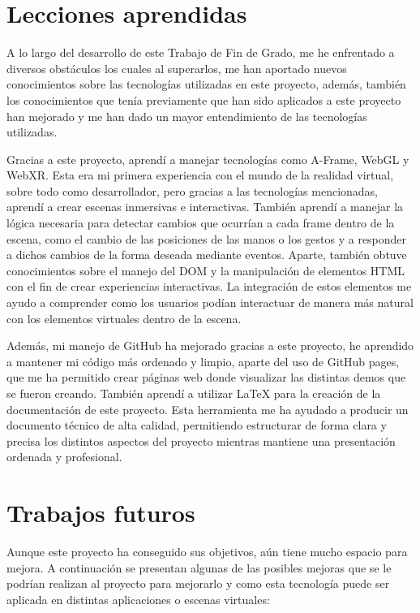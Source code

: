 \documentclass[a4paper, 12pt]{book}
\begin{document}
\section{Lecciones aprendidas}
\label{sec:lecciones_aprendidas}

A lo largo del desarrollo de este Trabajo de Fin de Grado, me he enfrentado a diversos obstáculos los cuales al superarlos, me han aportado nuevos conocimientos sobre las tecnologías utilizadas en este proyecto, además, también los conocimientos que tenía previamente que han sido aplicados a este proyecto han mejorado y me han dado un mayor entendimiento de las tecnologías utilizadas.

Gracias a este proyecto, aprendí a manejar tecnologías como A-Frame, WebGL y WebXR. Esta era mi primera experiencia con el mundo de la realidad virtual, sobre todo como desarrollador, pero gracias a las tecnologías mencionadas, aprendí a crear escenas inmersivas e interactivas. También aprendí a manejar la lógica necesaria para detectar cambios que ocurrían a cada frame dentro de la escena, como el cambio de las posiciones de las manos o los gestos y a responder a dichos cambios de la forma deseada mediante eventos. 
Aparte, también obtuve conocimientos sobre el manejo del DOM y la manipulación de elementos HTML con el fin de crear experiencias interactivas. La integración de estos elementos me ayudo a comprender como los usuarios podían interactuar de manera más natural con los elementos virtuales dentro de la escena.

Además, mi manejo de GitHub ha mejorado gracias a este proyecto, he aprendido a mantener mi código más ordenado y limpio, aparte del uso de GitHub pages, que me ha permitido crear páginas web donde visualizar las distintas demos que se fueron creando. También aprendí a utilizar LaTeX para la creación de la documentación de este proyecto. Esta herramienta me ha ayudado a producir un documento técnico de alta calidad, permitiendo estructurar de forma clara y precisa los distintos aspectos del proyecto mientras mantiene una presentación ordenada y profesional. 

\section{Trabajos futuros}
\label{sec:trabajos_futuros}
Aunque este proyecto ha conseguido sus objetivos, aún tiene mucho espacio para mejora. A continuación se presentan algunas de las posibles mejoras que se le podrían realizan al proyecto para mejorarlo y como esta tecnología puede ser aplicada en distintas aplicaciones o escenas virtuales:
\end{document}

